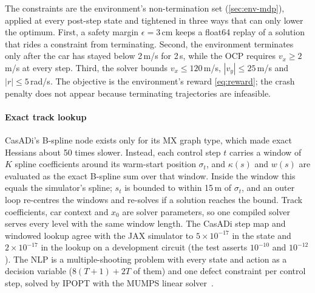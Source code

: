 The constraints are the environment's non-termination set (\cref{sec:env-mdp}), applied
at every post-step state and tightened in three ways that can only lower the optimum.
First, a safety margin $\epsilon = 3$\,cm keeps a float64 replay of a solution that rides
a constraint from terminating. Second, the environment terminates only after the car has
stayed below 2\,m/s for 2\,s, while the OCP requires $v_x \ge 2$\,m/s at every step.
Third, the solver bounds $v_x \le 120$\,m/s, $|v_y| \le 25$\,m/s and $|r| \le 5$\,rad/s.
The objective is the environment's reward \eqref{eq:reward}; the crash penalty does not
appear because terminating trajectories are infeasible.

\paragraph{Exact track lookup} CasADi's B-spline node exists only for its MX graph type,
which made exact Hessians about 50 times slower. Instead, each control step $t$ carries a
window of $K$ spline coefficients around its warm-start position $\sigma_t$, and
$\kappa(s)$ and $w(s)$ are evaluated as the exact B-spline sum over that window.
Inside the window this equals the simulator's spline; $s_t$ is bounded to within 15\,m of
$\sigma_t$, and an outer loop re-centres the windows and re-solves if a solution reaches
the bound. Track coefficients, car context and $x_0$ are solver parameters, so one
compiled solver serves every level with the same window length.
The CasADi step map and windowed lookup agree with the JAX simulator to
$5\times10^{-17}$ in the state and $2\times10^{-17}$ in the lookup on a development
circuit (the test asserts $10^{-10}$ and $10^{-12}$).
The NLP is a multiple-shooting problem with every state and action as a decision
variable ($8(T+1) + 2T$ of them) and one defect constraint per control step, solved by
IPOPT with the MUMPS linear solver~\citep{wachter2006ipopt,andersson2019casadi}.

